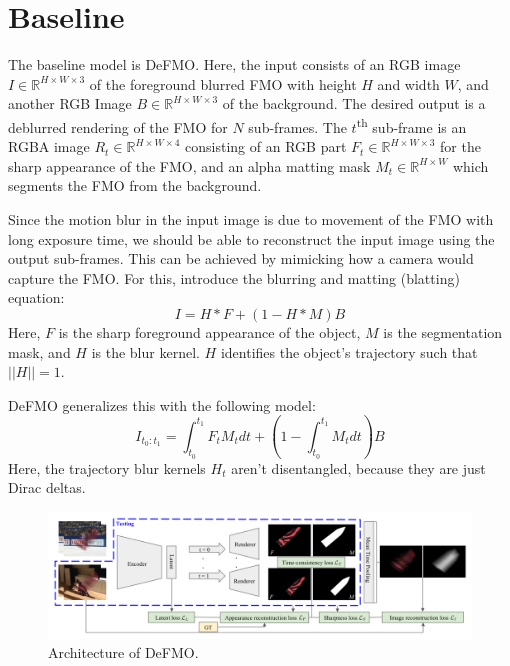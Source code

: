 \section{Baseline}

The baseline model is DeFMO.\@
Here, the input consists of an RGB image $I \in \mathbb{R}^{H \times W \times 3}$ of the foreground blurred FMO with height $H$ and width $W$, and another RGB Image $B \in \mathbb{R}^{H \times W \times 3}$ of the background.
The desired output is a deblurred rendering of the FMO for $N$ sub-frames.
The $t$\textsuperscript{th} sub-frame is an RGBA image $R_t \in \mathbb{R}^{H \times W \times 4}$ consisting of an RGB part $F_t \in \mathbb{R}^{H \times W \times 3}$ for the sharp appearance of the FMO, and an alpha matting mask $M_t \in \mathbb{R}^{H \times W}$ which segments the FMO from the background.

Since the motion blur in the input image is due to movement of the FMO with long exposure time, we should be able to reconstruct the input image using the output sub-frames.
This can be achieved by mimicking how a camera would capture the FMO.\@
For this, \citet{blatting-1,blatting-2} introduce the blurring and matting (blatting) equation:
\begin{equation}
    I = H \ast F + (1 - H \ast M) B \label{eq:blatting}
\end{equation}
Here, $F$ is the sharp foreground appearance of the object, $M$ is the segmentation mask, and $H$ is the blur kernel.
$H$ identifies the object's trajectory such that $||H|| = 1$.

DeFMO generalizes this with the following model:
\begin{equation}
    I_{t_0:t_1} = \int_{t_0}^{t_1} F_t M_t dt + \left( 1 - \int_{t_0}^{t_1} M_t dt \right) B \label{eq:defmo-blatting}
\end{equation}
Here, the trajectory blur kernels $H_t$ aren't disentangled, because they are just Dirac deltas.

\begin{figure}
    \centering
    \includegraphics[width=\textwidth]{images/defmo-arch.png}
    \caption{Architecture of DeFMO.}%
    \label{fig:defmo-arch}
\end{figure}

